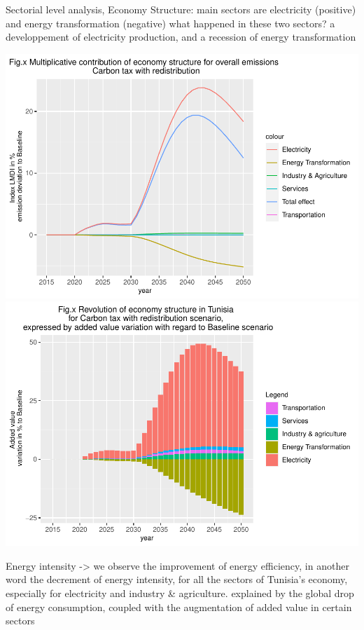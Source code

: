 \documentclass[
]{article}
\begin{document}
Sectorial level analysis, Economy Structure: main sectors are
electricity (positive) and energy transformation (negative) what
happened in these two sectors? a developpement of electricity
production, and a recession of energy transformation

\includegraphics{Modele-ThreeMe-Tunisie_Sequeira_Valilou_Wang_files/figure-latex/unnamed-chunk-18-1.pdf}
\includegraphics{Modele-ThreeMe-Tunisie_Sequeira_Valilou_Wang_files/figure-latex/unnamed-chunk-18-2.pdf}

Energy intensity -\textgreater{} we observe the improvement of energy
efficiency, in another word the decrement of energy intensity, for all
the sectors of Tunisia's economy, especially for electricity and
industry \& agriculture. explained by the global drop of energy
consumption, coupled with the augmentation of added value in certain
sectors
\end{document}
